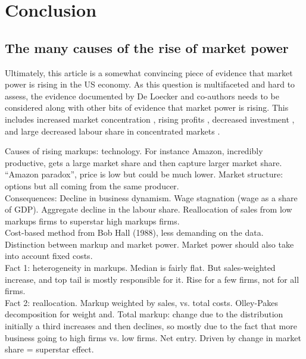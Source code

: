 \documentclass{amsart}
\theoremstyle{definition}
\theoremstyle{remark}
\numberwithin{equation}{section}
\begin{document}
\section*{Conclusion}

\subsection{The many causes of the rise of market power} Ultimately, this article is a somewhat convincing piece of evidence that market power is rising in the US economy. As this question is multifaceted and hard to assess, the evidence documented by De Loecker and co-authors needs to be considered along with other bits of evidence that market power is rising. This includes increased market concentration \citep{autor2017concentrating}, rising profits \citep{barkai2019declining}, decreased investment \citep{gutierrez2017investment}, and large decreased labour share in concentrated markets \cite{azar2017labor}.

Causes of rising markups: technology. For instance Amazon, incredibly productive, gets a large market share and then capture larger market share. ``Amazon paradox'', price is low but could be much lower. Market structure: options but all coming from the same producer.\\

Consequences: Decline in business dynamism. Wage stagnation (wage as a share of GDP). Aggregate decline in the labour share. Reallocation of sales from low markups firms to superstar high markups firms.\\

Cost-based method from Bob Hall (1988), less demanding on the data. \\

Distinction between markup and market power. Market power should also take into account fixed costs.\\

Fact 1: heterogeneity in markups. Median is fairly flat. But sales-weighted increase, and top tail is mostly responsible for it. Rise for a few firms, not for all firms.\\

Fact 2: reallocation. Markup weighted by sales, vs. total costs. Olley-Pakes decomposition for weight and. Total markup: change due to the distribution initially a third increases and then declines, so mostly due to the fact that more business going to high firms vs. low firms. Net entry. Driven by change in market share = superstar effect. \\
\end{document}
